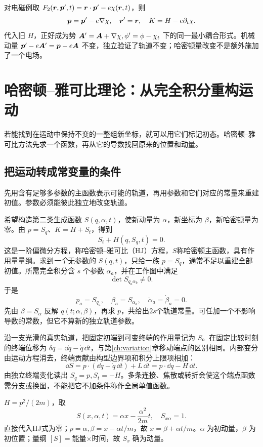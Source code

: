 \begin{example}[规范变换作为含时正则变换]
对电磁例取 $F_2(\boldsymbol{r},\boldsymbol{p}',t)=\boldsymbol{r}\cdot\boldsymbol{p}'-e\chi(\boldsymbol{r},t)$，则
\[
\boldsymbol{p}=\boldsymbol{p}'-e\nabla\chi,\quad\boldsymbol{r}'=\boldsymbol{r},\quad
K=H-e\partial_t\chi.
\]
代入旧 $H$，正好成为势 $\boldsymbol{A}'=\boldsymbol{A}+\nabla\chi,\phi'=\phi-\chi_t$ 下的同一最小耦合形式。机械动量 $\boldsymbol{p}'-e\boldsymbol{A}'=\boldsymbol{p}-e\boldsymbol{A}$ 不变，独立验证了轨道不变；哈密顿量改变不是额外施加了一个电场。
\end{example}


\section{哈密顿--雅可比理论：从完全积分重构运动}
若能找到在运动中保持不变的一整组新坐标，就可以用它们标记初态。哈密顿--雅可比方法先求一个函数，再从它的导数找回原来的位置和动量。

\subsection{把运动转成常变量的条件}
先用含有足够多参数的主函数表示可能的轨道，再用参数和它们对应的常量来重建初值。参数必须能彼此独立地改变轨道。

希望构造第二类生成函数 $S(q,\alpha,t)$，使新动量为 $\alpha$，新坐标为 $\beta$，新哈密顿量为零。由 $p=S_q$、$K=H+S_t$，得到
\begin{equation}
\boxed{S_t+H(q,S_q,t)=0.}
\label{eq:HJ}
\end{equation}
这是一阶偏微分方程，称哈密顿--雅可比（HJ）方程，$S$称哈密顿主函数，具有作用量量纲。求到\emph{一个}无参数的 $S(q,t)$，只给一族 $p=S_q$，通常不足以重建全部初值。所需完全积分含 $s$ 个参数 $\alpha_a$，并在工作图中满足
\[
\det S_{q_a\alpha_b}\ne0.
\]
于是
\[
p_a=S_{q_a},\quad \beta_a=S_{\alpha_a},\quad
\dot\alpha_a=\dot\beta_a=0.
\]
先由 $\beta=S_\alpha$ 反解 $q(t;\alpha,\beta)$，再求 $p$，共给出$2s$个轨道常量。可任加一个不影响导数的常数，但它不算新的独立轨道参数。

沿一支光滑的真实轨道，把固定初端到可变终端的作用量记为 $S$。在固定比较时刻的终端位移为 $\delta q=\dd q-\dot q\,\dd t$，与第\ref{ch:variation}章移动端点的区别相同。内部变分由运动方程消去，终端贡献由构型边界项和积分上限项相加：
\[
\dd S=p\cdot(\dd q-\dot q\,\dd t)+L\,\dd t
=p\cdot\dd q-H\,\dd t .
\]
由独立终端变化读出 $S_q=p,S_t=-H$。多条连接、焦散或转折会使这个端点函数需分支或换图，不能把它不加条件称作全局单值函数。

\begin{example}[自由粒子的完全积分]
$H=p^2/(2m)$，取
\[
S(x,\alpha,t)=\alpha x-\frac{\alpha^2}{2m}t,
\quad S_{x\alpha}=1.
\]
直接代入HJ式为零；$p=\alpha,\beta=x-\alpha t/m$，故 $x=\beta+\alpha t/m$。$\alpha$ 为初动量，$\beta$ 为初位置；量纲 $[S]=$能量$\times$时间，故 $S_x$ 确为动量。
\end{example}

